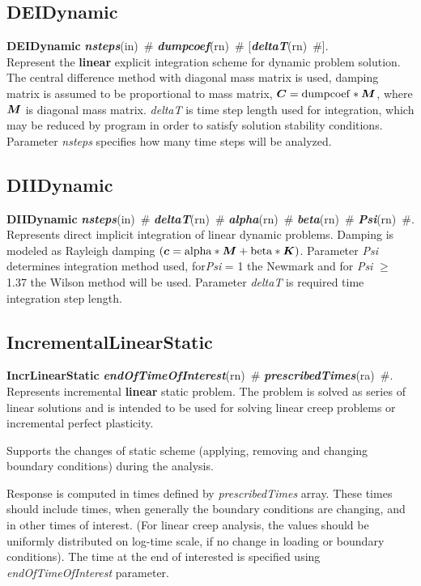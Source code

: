 \documentclass[draft]{article}
\newcommand{\mbf}[1]{\mbox{\boldmath$#1$}}
\newcommand{\param}[1]{{\em #1}}
\newcommand{\keywordnotype}[1]{\mbox{{\it{\bf{#1}}}}}
\newcommand{\keyword}[2]{\mbox{{\keywordnotype{#1}\tiny (#2)}}}
\newcommand{\entKeywordInst}[1]{\mbox{{\bf{{#1}}}}}
\newcommand{\field}[2]{\mbox{\keyword{#1}{#2}~\#}}
\newcommand{\optField}[2]{\mbox{[\field{#1}{#2}]}}
\begin{document}
\subsection{DEIDynamic}
\label{DEIDynamic}
\entKeywordInst{DEIDynamic} \field{nsteps}{in}
\field{dumpcoef}{rn} \optField{deltaT}{rn}.\\
Represent the {\bf linear} explicit
integration scheme for dynamic problem solution. The central difference method with diagonal mass matrix is used,
damping matrix is assumed to be proportional to mass matrix, $\mbf{C} = {\rm dumpcoef} * \mbf{M}$, where
$\mbf{M}$ is diagonal mass matrix. \param{deltaT} is time step length used for
integration, which may be reduced by program in order to satisfy
solution stability conditions. Parameter \param{nsteps} specifies
how many time steps will be analyzed.

\subsection{DIIDynamic}
\label{DIIDynamic}
\entKeywordInst{DIIDynamic} \field{nsteps}{in}
\field{deltaT}{rn} \field{alpha}{rn} \field{beta}{rn}
\field{Psi}{rn}.\\
Represents direct implicit integration of linear dynamic
problems. Damping is modeled as Rayleigh damping $(\mbf{c} =
\rm{alpha}*\mbf{M} + \rm{beta} * \mbf{K})$. Parameter \param{Psi} determines
integration method used, for\param{Psi} = 1 the Newmark and for \param{Psi} $\ge$ 1.37 the Wilson method
will be used. Parameter \param{deltaT} is required time integration
step length.

\subsection{IncrementalLinearStatic}
\label{IncrementalLinearStatic}
\entKeywordInst{IncrLinearStatic}
\field{endOfTimeOfInterest}{rn} \field{pre\-scri\-bed\-Ti\-mes}{ra}.\\
Represents incremental {\bf linear} static problem.
The problem is solved as series of linear solutions and is intended to 
be used for solving linear creep problems or incremental perfect plasticity.

Supports the changes of static scheme (applying, removing and changing  boundary conditions) 
during the analysis.

Response is computed in times defined by \param{pre\-scri\-bed\-Ti\-mes}
array. These times should include times, when generally the  boundary
conditions are changing, and in other times of interest. (For linear creep
analysis, the values should be uniformly distributed on log-time scale, if no change in
loading or boundary conditions). The time at the end of interested is
specified using \param{endOfTimeOfInterest} parameter.
\end{document}

